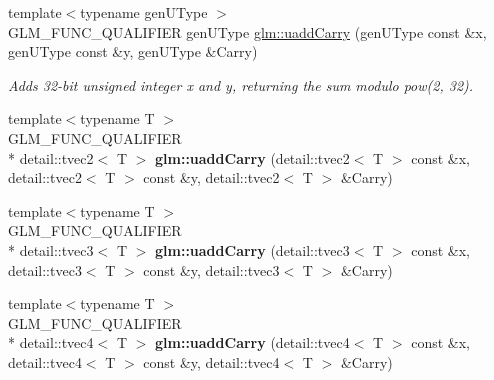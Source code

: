 \begin{DoxyCompactItemize}
\item 
{\footnotesize template$<$typename gen\-U\-Type $>$ }\\G\-L\-M\-\_\-\-F\-U\-N\-C\-\_\-\-Q\-U\-A\-L\-I\-F\-I\-E\-R gen\-U\-Type \hyperlink{group__core__func__integer_ga7d96efb73301e722a527b912f05f6ac0}{glm\-::uadd\-Carry} (gen\-U\-Type const \&x, gen\-U\-Type const \&y, gen\-U\-Type \&Carry)
\begin{DoxyCompactList}\small\item\em Adds 32-\/bit unsigned integer x and y, returning the sum modulo pow(2, 32). \end{DoxyCompactList}\item 
\hypertarget{namespaceglm_a87a1c2105448723bbd560ea9157da7f7}{{\footnotesize template$<$typename T $>$ }\\G\-L\-M\-\_\-\-F\-U\-N\-C\-\_\-\-Q\-U\-A\-L\-I\-F\-I\-E\-R \\*
detail\-::tvec2$<$ T $>$ {\bfseries glm\-::uadd\-Carry} (detail\-::tvec2$<$ T $>$ const \&x, detail\-::tvec2$<$ T $>$ const \&y, detail\-::tvec2$<$ T $>$ \&Carry)}\label{namespaceglm_a87a1c2105448723bbd560ea9157da7f7}

\item 
\hypertarget{namespaceglm_a7b00aba4f9826a78a4bcdd7a9aef5b7f}{{\footnotesize template$<$typename T $>$ }\\G\-L\-M\-\_\-\-F\-U\-N\-C\-\_\-\-Q\-U\-A\-L\-I\-F\-I\-E\-R \\*
detail\-::tvec3$<$ T $>$ {\bfseries glm\-::uadd\-Carry} (detail\-::tvec3$<$ T $>$ const \&x, detail\-::tvec3$<$ T $>$ const \&y, detail\-::tvec3$<$ T $>$ \&Carry)}\label{namespaceglm_a7b00aba4f9826a78a4bcdd7a9aef5b7f}

\item 
\hypertarget{namespaceglm_a23d2f491392fa08223abc23ec758d2d5}{{\footnotesize template$<$typename T $>$ }\\G\-L\-M\-\_\-\-F\-U\-N\-C\-\_\-\-Q\-U\-A\-L\-I\-F\-I\-E\-R \\*
detail\-::tvec4$<$ T $>$ {\bfseries glm\-::uadd\-Carry} (detail\-::tvec4$<$ T $>$ const \&x, detail\-::tvec4$<$ T $>$ const \&y, detail\-::tvec4$<$ T $>$ \&Carry)}\label{namespaceglm_a23d2f491392fa08223abc23ec758d2d5}


\end{DoxyCompactItemize}
